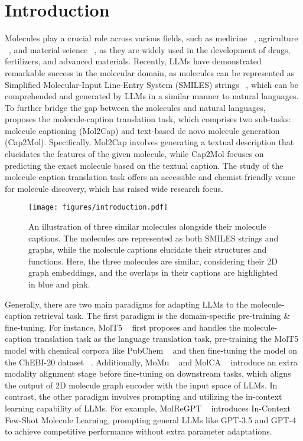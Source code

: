 \section{Introduction}
Molecules play a crucial role across various fields, such as medicine ~\cite{ding2019selective}, agriculture ~\cite{twyman2003molecular}, and material science ~\cite{higuchi2023material}, as they are widely used in the development of drugs, fertilizers, and advanced materials. Recently, LLMs have demonstrated remarkable success in the molecular domain, as molecules can be represented as Simplified Molecular-Input Line-Entry System (SMILES) strings ~\cite{weininger1988smiles}, which can be comprehended and generated by LLMs in a similar manner to natural languages. 
To further bridge the gap between the molecules and natural languages, ~\citet{edwards-etal-2022-translation} proposes the molecule-caption translation task, which comprises two sub-tasks: molecule captioning (Mol2Cap) and text-based de novo molecule generation (Cap2Mol). Specifically, Mol2Cap involves generating a textual description that elucidates the features of the given molecule, while Cap2Mol focuses on predicting the exact molecule based on the textual caption. The study of the molecule-caption translation task offers an accessible and chemist-friendly venue for molecule discovery, which has raised wide research focus.
\begin{figure}
    \centering
    \texttt{[image: figures/introduction.pdf]}
    \caption{An illustration of three similar molecules alongside their molecule captions. The molecules are represented as both SMILES strings and graphs, while the molecule captions elucidate their structures and functions. Here, the three molecules are similar, considering their 2D graph embeddings, and the overlaps in their captions are highlighted in blue and pink.}
    \label{fig:intro}
    \vskip -0.2in
\end{figure}

Generally, there are two main paradigms for adapting LLMs to the molecule-caption retrieval task. 
The first paradigm is the domain-specific pre-training \& fine-tuning. For instance, MolT5 ~\cite{edwards-etal-2022-translation} first proposes and handles the molecule-caption translation task as the language translation task, pre-training the MolT5 model with chemical corpora like PubChem ~\cite{kim2019pubchem} and then fine-tuning the model on the ChEBI-20 dataset ~\cite{edwards2021text2mol}. Additionally, MoMu ~\cite{su2022molecular} and MolCA ~\cite{liu2023molca} introduce an extra modality alignment stage before fine-tuning on downstream tasks, which aligns the output of 2D molecule graph encoder with the input space of LLMs.
In contrast, the other paradigm involves prompting and utilizing the in-context learning capability of LLMs. For example, MolReGPT ~\cite{li2023empowering} introduces In-Context Few-Shot Molecule Learning, prompting general LLMs like GPT-3.5 and GPT-4 to achieve competitive performance without extra parameter adaptations.

